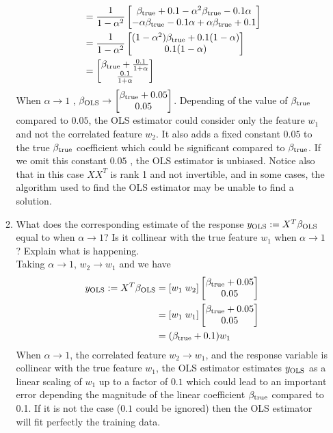 \documentclass[12pt,twoside]{article}
\begin{document}
\begin{enumerate}
\begin{enumerate}
\begin{align*}
						&= 	\frac{1}{1-\alpha^2}  \begin{bmatrix} \beta_{\operatorname{true}} + 0.1 -\alpha^2 \beta_{\operatorname{true}} -0.1 \alpha \\ -\alpha \beta_{\operatorname{true}} -0.1 \alpha + \alpha \beta_{\operatorname{true}}  + 0.1 \end{bmatrix} \\
						&=	\frac{1}{1-\alpha^2}  \begin{bmatrix} (1-\alpha^2)  \beta_{\operatorname{true}} + 0.1 (1-\alpha) \\ 0.1 (1 - \alpha) \end{bmatrix} \\
						&=  	\begin{bmatrix} \beta_{\operatorname{true}} + \frac{0.1} {1 + \alpha} \\ \frac{0.1} {1 + \alpha} \end{bmatrix}
\end{align*}
When $\alpha \rightarrow 1$ , $\beta_{\operatorname{OLS}} \rightarrow   \begin{bmatrix} \beta_{\operatorname{true}} + 0.05  \\ 0.05 \end{bmatrix}$.
Depending of the value of $\beta_{\operatorname{true}}$ compared to $0.05$, the OLS estimator could consider only the feature $w_1$ and not the correlated feature $w_2$.
It also  adds a fixed constant $0.05$ to the true $\beta_{\operatorname{true}}$ coefficient which could be significant compared to
 $\beta_{\operatorname{true}}$. If we omit this constant  $0.05$ ,  the OLS estimator is unbiased. 
 Notice also that in this case $XX^T$ is rank 1 and not invertible, and in some cases, the algorithm used to find the OLS estimator may be unable to find a solution.
    
   \item  What does the corresponding estimate of the response $y_{\operatorname{OLS}} := X^T\beta_{\operatorname{OLS}}$ equal to when $\alpha \rightarrow 1$? Is it collinear with the true feature $w_1$ when $\alpha \rightarrow 1$? Explain what is happening.\\
   
  \medskip
  Taking $\alpha \rightarrow 1$, $w_2 \rightarrow w_1$ and we have 
  \begin{align*}
	  y_{\operatorname{OLS}} := X^T\beta_{\operatorname{OLS}}	&= [w_1 \; w_2]  \begin{bmatrix} \beta_{\operatorname{true}} + 0.05  \\ 0.05 \end{bmatrix} \\
	  								&= [w_1 \; w_1] \begin{bmatrix} \beta_{\operatorname{true}} + 0.05  \\ 0.05 \end{bmatrix} \\
									&= ( \beta_{\operatorname{true}} + 0.1) w_1
  \end{align*}
  When $\alpha \rightarrow 1$, the correlated feature $w_2 \rightarrow w_1$, and the response variable is collinear with the true feature $w_1$, the OLS estimator estimates $y_{\operatorname{OLS}}$ as a linear scaling of $w_1$ 
  up to a factor of $0.1$ which could lead to an important error depending the magnitude of the linear coefficient  $\beta_{\operatorname{true}}$ compared to 0.1. If it is not the case ($0.1$ could be ignored) 
  then the OLS estimator will fit perfectly the training data.
    

\end{enumerate}
\end{enumerate}
\end{document}
